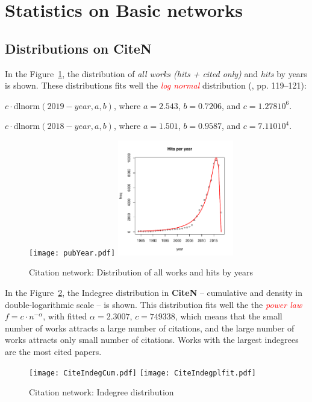 \documentclass[11pt]{article} %
\newcommand{\keyw}[1]{\textcolor{red}{\emph{#1}}}
\begin{document}
\section{Statistics on Basic networks}

\normalsize
\subsection{Distributions on CiteN}

In the Figure~\ref{yeard}, the distribution of \textit{all works (hits + cited only)} and \textit{hits} by years is shown. These distributions fits well the \keyw{log normal} distribution (\citep{Understand}, pp. 119–121): \smallskip 

$c\cdot \mbox{dlnorm}(2019-year,a,b)$, where $a = 2.543$, $b = 0.7206$, and $c = 1.278 10^6$. \medskip

$c\cdot \mbox{dlnorm}(2018-year,a,b)$, where $a = 1.501$, $b = 0.9587$, and $c = 7.110 10^4$.\medskip

\begin{figure}
\centerline{
\texttt{[image: pubYear.pdf]} \qquad
\includegraphics[width=0.45\textwidth]{yearshits7.pdf} }
\caption{Citation network: Distribution of all works and hits by years}\label{yeard}
\end{figure}
\medskip   

In the Figure~\ref{cindeg}, the Indegree distribution in \textbf{CiteN} -- cumulative and density in double-logarithmic scale --  is shown. This distribution fits well the the \keyw{power law} $f = c \cdot n^{-\alpha}$, with fitted $\alpha = 2.3007$, $c=749338$, which means that the small number of works   attracts a large number of citations, and the large number of works attracts only small number of citations. Works with the largest indegrees are the most cited papers. 

\begin{figure}
\centerline{
\texttt{[image: CiteIndegCum.pdf]} \qquad
\texttt{[image: CiteIndegplfit.pdf]} }
\caption{Citation network: Indegree distribution}\label{cindeg}
\end{figure}
\medskip   
\end{document}
